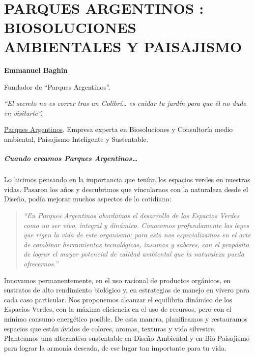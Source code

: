 \documentclass[
]{article}
\begin{document}
\textbf{\\
} \cleardoublepage

\hypertarget{parques-argentinos-biosoluciones-ambientales-y-paisajismo}{%
\section{PARQUES ARGENTINOS : BIOSOLUCIONES AMBIENTALES Y
PAISAJISMO}\label{parques-argentinos-biosoluciones-ambientales-y-paisajismo}}

\textbf{Emmanuel Baghin}

Fundador de ``Parques Argentinos''.

\emph{``El secreto no es correr tras un Colibrí\ldots{} es cuidar tu
jardín para que él no dude en visitarte''.}

\href{http://www.parquesargentinos.com}{Parques Argentinos}. Empresa
experta en Biosoluciones y Consultoría medio ambiental, Paisajismo
Inteligente y Sustentable.

\hypertarget{cuando-creamos-parques-argentinos}{%
\subparagraph{Cuando creamos Parques
Argentinos\ldots{}}\label{cuando-creamos-parques-argentinos}}

Lo hicimos pensando en la importancia que tenían los espacios verdes en
nuestras vidas. Pasaron los años y descubrimos que vincularnos con la
naturaleza desde el Diseño, podía mejorar muchos aspectos de lo
cotidiano:

\begin{quote}
\emph{``En Parques Argentinos abordamos el desarrollo de los Espacios
Verdes como un ser vivo, integral y dinámico. Conocemos profundamente
las leyes que rigen la vida de este organismo; para esto nos
especializamos en el arte de combinar herramientas tecnológicas, insumos
y saberes, con el propósito de lograr el mayor potencial de calidad
ambiental que la naturaleza pueda ofrecernos.''}
\end{quote}

Innovamos permanentemente, en el uso racional de productos orgánicos, en
sustratos de alto rendimiento biológico y, en estrategias de manejo en
vivero para cada caso particular. Nos proponemos alcanzar el equilibrio
dinámico de los Espacios Verdes, con la máxima eficiencia en el uso de
recursos, pero con el mínimo consumo energético posible. De esta manera,
planificamos y restauramos espacios que están ávidos de colores, aromas,
texturas y vida silvestre. Planteamos una alternativa sustentable en
Diseño Ambiental y en Bio Paisajismo para lograr la armonía deseada, de
ese lugar tan importante para tu vida.
\end{document}
